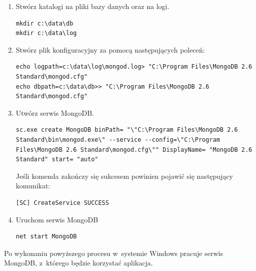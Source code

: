 \documentclass[12pt,a4paper,notitlepage]{article}
\begin{document}
\begin{enumerate}
\item Stwórz katalogi na pliki bazy danych oraz na logi.
\begin{lstlisting}
mkdir c:\data\db
mkdir c:\data\log
\end{lstlisting}
\newpage
\item Stwórz plik konfiguracyjny za pomocą następujących poleceń:
\begin{lstlisting}
echo logpath=c:\data\log\mongod.log> "C:\Program Files\MongoDB 2.6 Standard\mongod.cfg"
echo dbpath=c:\data\db>> "C:\Program Files\MongoDB 2.6 Standard\mongod.cfg"
\end{lstlisting}

\item Utwórz serwis MongoDB.
\begin{lstlisting}
sc.exe create MongoDB binPath= "\"C:\Program Files\MongoDB 2.6 Standard\bin\mongod.exe\" --service --config=\"C:\Program Files\MongoDB 2.6 Standard\mongod.cfg\"" DisplayName= "MongoDB 2.6 Standard" start= "auto"
\end{lstlisting}
Jeśli komenda zakończy się sukcesem powinien pojawić się następujący komunikat:
\begin{lstlisting}
[SC] CreateService SUCCESS
\end{lstlisting}

\item Uruchom serwis MongoDB
\begin{lstlisting}
net start MongoDB
\end{lstlisting}

\end{enumerate}

\par Po wykonaniu powyższego procesu w~systemie Windows pracuje serwis MongoDB, z~którego będzie korzystać aplikacja.
\end{document}

